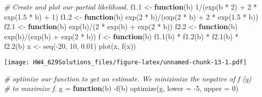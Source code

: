 \documentclass[
]{article}
\newenvironment{Shaded}{\begin{snugshade}}{\end{snugshade}}
\newcommand{\AttributeTok}[1]{\textcolor[rgb]{0.77,0.63,0.00}{#1}}
\newcommand{\CommentTok}[1]{\textcolor[rgb]{0.56,0.35,0.01}{\textit{#1}}}
\newcommand{\ControlFlowTok}[1]{\textcolor[rgb]{0.13,0.29,0.53}{\textbf{#1}}}
\newcommand{\DecValTok}[1]{\textcolor[rgb]{0.00,0.00,0.81}{#1}}
\newcommand{\FloatTok}[1]{\textcolor[rgb]{0.00,0.00,0.81}{#1}}
\newcommand{\FunctionTok}[1]{\textcolor[rgb]{0.00,0.00,0.00}{#1}}
\newcommand{\NormalTok}[1]{#1}
\newcommand{\OtherTok}[1]{\textcolor[rgb]{0.56,0.35,0.01}{#1}}
\newcommand{\SpecialCharTok}[1]{\textcolor[rgb]{0.00,0.00,0.00}{#1}}
\begin{document}
\begin{Shaded}
\begin{Highlighting}[]
\CommentTok{\# Create and plot our partial likelihood.}
\NormalTok{f1}\FloatTok{.1} \OtherTok{\textless{}{-}} \ControlFlowTok{function}\NormalTok{(b) }\DecValTok{1}\SpecialCharTok{/}\NormalTok{(}\FunctionTok{exp}\NormalTok{(b }\SpecialCharTok{*} \DecValTok{2}\NormalTok{) }\SpecialCharTok{+} \DecValTok{2} \SpecialCharTok{*} \FunctionTok{exp}\NormalTok{(}\FloatTok{1.5} \SpecialCharTok{*}\NormalTok{ b) }\SpecialCharTok{+} \DecValTok{1}\NormalTok{)}
\NormalTok{f1}\FloatTok{.2} \OtherTok{\textless{}{-}} \ControlFlowTok{function}\NormalTok{(b) }\FunctionTok{exp}\NormalTok{(}\DecValTok{2} \SpecialCharTok{*}\NormalTok{ b)}\SpecialCharTok{/}\NormalTok{(}\FunctionTok{exp}\NormalTok{(}\DecValTok{2} \SpecialCharTok{*}\NormalTok{ b) }\SpecialCharTok{+} \DecValTok{2} \SpecialCharTok{*} \FunctionTok{exp}\NormalTok{(}\FloatTok{1.5} \SpecialCharTok{*}\NormalTok{ b))}
\NormalTok{f2}\FloatTok{.1} \OtherTok{\textless{}{-}} \ControlFlowTok{function}\NormalTok{(b) }\FunctionTok{exp}\NormalTok{(b)}\SpecialCharTok{/}\NormalTok{(}\DecValTok{2} \SpecialCharTok{*} \FunctionTok{exp}\NormalTok{(b) }\SpecialCharTok{+} \FunctionTok{exp}\NormalTok{(}\DecValTok{2} \SpecialCharTok{*}\NormalTok{ b))}
\NormalTok{f2}\FloatTok{.2} \OtherTok{\textless{}{-}} \ControlFlowTok{function}\NormalTok{(b) }\FunctionTok{exp}\NormalTok{(b)}\SpecialCharTok{/}\NormalTok{(}\FunctionTok{exp}\NormalTok{(b) }\SpecialCharTok{+} \FunctionTok{exp}\NormalTok{(}\DecValTok{2} \SpecialCharTok{*}\NormalTok{ b))}
\NormalTok{f }\OtherTok{\textless{}{-}} \ControlFlowTok{function}\NormalTok{(b) }\FunctionTok{f1.1}\NormalTok{(b) }\SpecialCharTok{*} \FunctionTok{f1.2}\NormalTok{(b) }\SpecialCharTok{*} \FunctionTok{f2.1}\NormalTok{(b) }\SpecialCharTok{*} \FunctionTok{f2.2}\NormalTok{(b)}
\NormalTok{x }\OtherTok{\textless{}{-}} \FunctionTok{seq}\NormalTok{(}\SpecialCharTok{{-}}\DecValTok{20}\NormalTok{, }\DecValTok{10}\NormalTok{, }\FloatTok{0.01}\NormalTok{)}
\FunctionTok{plot}\NormalTok{(x, }\FunctionTok{f}\NormalTok{(x))}
\end{Highlighting}
\end{Shaded}

\texttt{[image: HW4\_629Solutions\_files/figure-latex/unnamed-chunk-13-1.pdf]}

\begin{Shaded}
\begin{Highlighting}[]
\CommentTok{\# optimize our function to get an estimate. We minizimize the negative of f (g)}
\CommentTok{\# to maximize f.}
\NormalTok{g }\OtherTok{=} \ControlFlowTok{function}\NormalTok{(b) }\SpecialCharTok{{-}}\FunctionTok{f}\NormalTok{(b)}
\FunctionTok{optimize}\NormalTok{(g, }\AttributeTok{lower =} \SpecialCharTok{{-}}\DecValTok{5}\NormalTok{, }\AttributeTok{upper =} \DecValTok{0}\NormalTok{)}
\end{Highlighting}
\end{Shaded}
\end{document}

